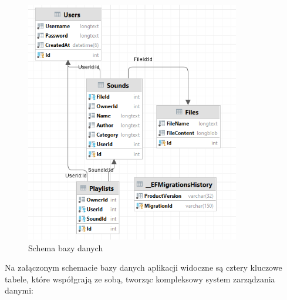 \begin{figure}[!ht]
	\begin{center}
	\includegraphics[height=300pt]{figures/schema.png}
        \caption{{\footnotesize Schema bazy danych}}
	\end{center}
\end{figure}

Na załączonym schemacie bazy danych aplikacji widoczne są cztery kluczowe tabele, które współgrają ze sobą, tworząc kompleksowy system zarządzania danymi:




